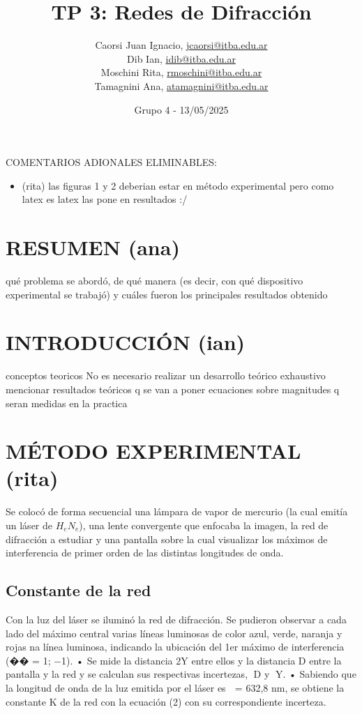 \documentclass[12pt, a4paper]{article}
\title{TP 3: Redes de Difracción}
\author
{
  Caorsi Juan Ignacio, \href{jcaorsi@itba.edu.ar}{jcaorsi@itba.edu.ar} \\
  Dib Ian, \href{idib@itba.edu.ar}{idib@itba.edu.ar} \\
  Moschini Rita, \href{rmoschini@itba.edu.ar}{rmoschini@itba.edu.ar} \\
  Tamagnini Ana, \href{atamagnini@itba.edu.ar}{atamagnini@itba.edu.ar}
}
\date{Grupo 4 - 13/05/2025}
\begin{document}
\maketitle

COMENTARIOS ADIONALES ELIMINABLES:
\begin{itemize}
\item (rita) las figuras 1 y 2 deberian estar en método experimental pero como latex es latex las pone en resultados :/
\end{itemize}

\section{RESUMEN (ana)}
qué problema se abordó, de qué manera (es decir, con qué dispositivo experimental se trabajó) y cuáles fueron los principales resultados obtenido

\section{INTRODUCCIÓN (ian)}
conceptos teoricos
No es necesario realizar un desarrollo teórico exhaustivo
mencionar resultados teóricos q se van a poner
ecuaciones sobre magnitudes q seran medidas en la practica

\section{MÉTODO EXPERIMENTAL (rita)}
Se colocó de forma secuencial una lámpara de vapor de mercurio (la cual emitía un láser de $H_{e}N_{e}$), una lente convergente que enfocaba la imagen, la red de difracción a estudiar y una pantalla sobre la cual visualizar los máximos de interferencia de primer orden de las distintas longitudes de onda.

\subsection{Constante de la red}
Con la luz del láser se iluminó la red de difracción. Se pudieron observar a cada lado del máximo central varias líneas luminosas de color azul, verde, naranja y rojas na línea luminosa, indicando la ubicación del 1er máximo de interferencia (�� = 1; −1).
• Se mide la distancia 2Y entre ellos y la distancia D entre la pantalla y la red y se calculan sus
respectivas incertezas, D y Y.
• Sabiendo que la longitud de onda de la luz emitida por el láser es  = 632,8 nm, se obtiene la constante K de la red con la ecuación (2) con su correspondiente incerteza.
\end{document}
